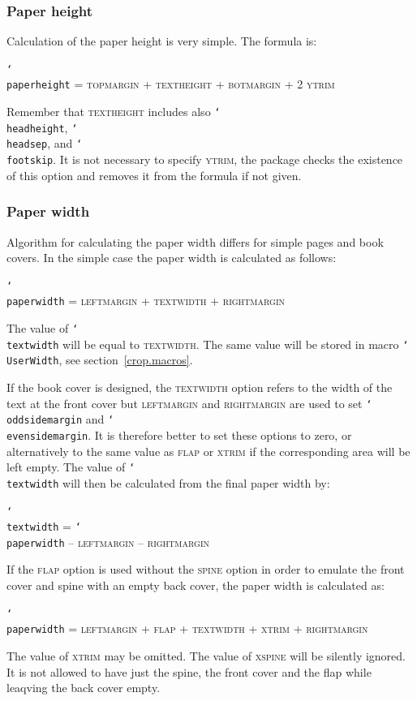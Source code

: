 \documentclass[11pt]{article}
\def\opt#1{\texorpdfstring{\textmd{\textsc{#1}}}{#1}}
\DeclareRobustCommand\cmd[1]{\texttt{\char`\\#1}}
\begin{document}
\subsubsection{Paper height}
Calculation of the paper height is very simple. The formula is:

\vb
\cmd{paperheight} = \opt{topmargin} + \opt{textheight} + \opt{botmargin} + 2 \opt{ytrim}

\vb \noindent
Remember that \opt{textheight} includes also \cmd{headheight}, \cmd{headsep}, and \cmd{footskip}.
It is not necessary to specify \opt{ytrim}, the package checks the existence of this option and
removes it from the formula if not given.

\subsubsection{Paper width}
Algorithm for calculating the paper width differs for simple pages and book covers. In the simple
case the paper width is calculated as follows:

\vb
\cmd{paperwidth} = \opt{leftmargin} + \opt{textwidth} + \opt{rightmargin}

\vb \noindent
The value of \cmd{textwidth} will be equal to \opt{textwidth}. The same value will be stored in
macro \cmd{UserWidth}, see section~\ref{crop.macros}.

If the book cover is designed, the \opt{textwidth} option refers to the width of the text at the
front cover but \opt{leftmargin} and \opt{rightmargin} are used to set \cmd{oddsidemargin} and
\cmd{evensidemargin}. It is therefore better to set these options to zero, or alternatively to the
same value as \opt{flap} or \opt{xtrim} if the corresponding area will be left empty. The value of
\cmd{textwidth} will then be calculated from the final paper width by:

\vb
\cmd{textwidth} = \cmd{paperwidth} -- \opt{leftmargin} -- \opt{rightmargin}

\vb
If the \opt{flap} option is used without the \opt{spine} option in order to emulate the front cover
and spine with an empty back cover, the paper width is calculated as:

\vb
\cmd{paperwidth} = \opt{leftmargin} + \opt{flap} + \opt{textwidth} + \opt{xtrim} +
\opt{rightmargin}

\vb \noindent
The value of \opt{xtrim} may be omitted. The value of \opt{xspine} will be silently ignored. It is
not allowed to have just the spine, the front cover and the flap while leaqving the back cover
empty.
\end{document}

